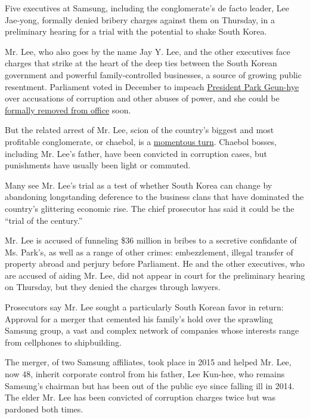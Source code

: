 Five executives at Samsung, including the conglomerate's de facto
leader, Lee Jae-yong, formally denied bribery charges against them on
Thursday, in a preliminary hearing for a trial with the potential to
shake South Korea.

Mr. Lee, who also goes by the name Jay Y. Lee, and the other executives
face charges that strike at the heart of the deep ties between the South
Korean government and powerful family-controlled businesses, a source of
growing public resentment. Parliament voted in December to impeach
\href{https://www.nytimes3xbfgragh.onion/2016/12/09/world/asia/south-korea-president-park-geun-hye-impeached.html}{President
Park Geun-hye} over accusations of corruption and other abuses of power,
and she could be
\href{https://www.nytimes3xbfgragh.onion/2017/03/08/world/asia/south-korea-president-impeach-park-geun-hye.html?rref=collection\%2Ftimestopic\%2FPark\%20Geun-hye\&action=click\&contentCollection=timestopics\&region=stream\&module=stream_unit\&version=latest\&contentPlacement=2\&pgtype=collection}{formally
removed from office} soon.

But the related arrest of Mr. Lee, scion of the country's biggest and
most profitable conglomerate, or chaebol, is a
\href{https://www.nytimes3xbfgragh.onion/2017/03/04/business/south-korea-samsung-bribery-lee.html}{momentous
turn}. Chaebol bosses, including Mr. Lee's father, have been convicted
in corruption cases, but punishments have usually been light or
commuted.

Many see Mr. Lee's trial as a test of whether South Korea can change by
abandoning longstanding deference to the business clans that have
dominated the country's glittering economic rise. The chief prosecutor
has said it could be the ``trial of the century.''

Mr. Lee is accused of funneling \$36 million in bribes to a secretive
confidante of Ms. Park's, as well as a range of other crimes:
embezzlement, illegal transfer of property abroad and perjury before
Parliament. He and the other executives, who are accused of aiding Mr.
Lee, did not appear in court for the preliminary hearing on Thursday,
but they denied the charges through lawyers.

Prosecutors say Mr. Lee sought a particularly South Korean favor in
return: Approval for a merger that cemented his family's hold over the
sprawling Samsung group, a vast and complex network of companies whose
interests range from cellphones to shipbuilding.

The merger, of two Samsung affiliates, took place in 2015 and helped Mr.
Lee, now 48, inherit corporate control from his father, Lee Kun-hee, who
remains Samsung's chairman but has been out of the public eye since
falling ill in 2014. The elder Mr. Lee has been convicted of corruption
charges twice but was pardoned both times.

